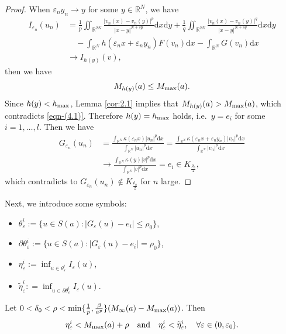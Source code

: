 \documentclass[reqno]{amsart}
\begin{document}
\begin{proof}
When $\varepsilon_n y_n\to y$ for some $y\in\mathbb{R}^N$, we have
\begin{align*}
I_{\varepsilon_n}(u_n)
&= \frac{1}{p}\iint_{\mathbb{R}^{2N}}\frac{|v_n(x)-v_n(y)|^{p}}{|x-y|^{N+sp}}
 \mathrm{d}x\mathrm{d}y+\frac{1}{q}\iint_{\mathbb{R}^{2N}}
 \frac{|v_n(x)-v_n(y)|^{q}}{|x-y|^{N+sq}}\mathrm{d}x\mathrm{d}y\\
&\quad -\int_{\mathbb{R}^N}h(\varepsilon_n x+\varepsilon_n y_n)F(v_n)\mathrm{d}x
 -\int_{\mathbb{R}^N}G(v_n)\mathrm{d}x\\
&\to I_{h(y)}(v),
\end{align*}
then we have
\begin{equation}\label{eqn-(4.1)}
M_{h(y)}(a)\le M_{\rm max}(a).
\end{equation}
Since $h(y) < h_{\rm max}$, Lemma \ref{cor:2.1} implies that $M_{h(y)}
(a) > M_{\rm max}(a)$,
 which contradicts \eqref{eqn-(4.1)}.
Therefore $h(y) = h_{\rm max}$ holds, i.e.\ $y = e_i$
for some $i = 1,\dots,l$. Then we have
\begin{align*}
G_{\varepsilon_n}(u_n)
&=\frac{\int_{\mathbb{R}^N}\kappa(\varepsilon_n x)|u_n|^{p}\mathrm{d}x}
 {\int_{\mathbb{R}^N}|u_n|^{p}\mathrm{d}x}
 =\frac{\int_{\mathbb{R}^N}\kappa(\varepsilon_n x+\varepsilon_n y_n)|v_n|^{p}
 \mathrm{d}x}{\int_{\mathbb{R}^N}|v_n|^{p}\mathrm{d}x}\\
&\to\frac{\int_{\mathbb{R}^N}\kappa(y)|v|^{p}\mathrm{d}x}
{\int_{\mathbb{R}^N}|v|^{p}\mathrm{d}x}=e_i\in K_{\frac{\rho_0}{2}},
\end{align*}
which contradicts to $G_{\varepsilon_n}(u_n)\not\in K_{\frac{\rho_0}{2}}$ for $n$ 
large.
\end{proof}

Next, we introduce some symbols:
\begin{itemize}
\item $\theta_\varepsilon^{i}:=\{u\in S(a):|G_{\varepsilon}(u)-e_i|\le\rho_0\}$,
\item $\partial\theta_\varepsilon^{i}:=\{u\in S(a):|G_{\varepsilon}(u)-e_i|=\rho_0\}$,
\item $\eta_\varepsilon^{i}:=\inf_{u\in\theta_\varepsilon^{i}}  I_\varepsilon(u)$,
\item $\widetilde\eta_\varepsilon^{i}:
=\inf_{u\in\partial\theta_\varepsilon^{i}}  I_\varepsilon(u)$.
\end{itemize}

\begin{lemma}\label{lem:4.2}
Let $0<\delta_0<\rho<\min\{{\frac{1}{p},\frac{\beta}{a^{p}}}\}
(M_\infty(a)-M_{\rm max}(a))$.
Then
$$
\eta_\varepsilon^{i}<M_{\rm max}(a)+\rho\quad \text{and} \quad 
\eta_\varepsilon^{i}<\widetilde\eta_\varepsilon^{i},\quad 
\forall\varepsilon\in(0,\varepsilon_0).
$$
\end{lemma}
\end{document}

